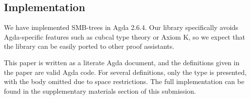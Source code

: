 \subsection{Implementation}

We have implemented SMB-trees in Agda 2.6.4.
Our library specifically avoids Agda-specific features
such as cubcal type theory or Axiom K, so we expect
that the library can be easily ported to other proof assistants.

This paper is written as a literate Agda document, and the definitions
given in the paper are valid Agda code.
For several definitions, only the type is presented, with the body omitted due to
space restrictions. The full implementation can be found in the supplementary
materials section of this submission.
